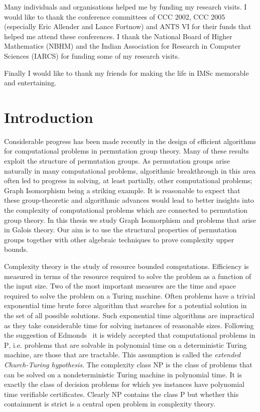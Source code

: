 \documentclass[11pt]{madras}%
\theoremstyle{remark}
\begin{document}
Many individuals and organisations helped me by funding my research
visits.  I would like to thank the conference committees of CCC 2002,
CCC 2005 (especially Eric Allender and Lance Fortnow) and ANTS VI for
their funds that helped me attend these conferences.  I thank the
National Board of Higher Mathematics (NBHM) and the Indian Association
for Research in Computer Sciences (IARCS) for funding some of my
research visits.

Finally I would like to thank my friends for making the life in IMSc
memorable and entertaining.



\tableofcontents
\renewcommand{\nomname}{Notation\addcontentsline{toc}{chapter}{Notation}}
\printglossary

\chapter{Introduction}%

Considerable progress has been made recently in the design of
efficient algorithms for computational problems in permutation group
theory. Many of these results exploit the structure of permutation
groups. As permutation groups arise naturally in many computational
problems, algorithmic breakthrough in this area often led to progress
in solving, at least partially, other computational problems; Graph
Isomorphism being a striking example. It is reasonable to expect that
these group-theoretic and algorithmic advances would lead to better
insights into the complexity of computational problems which are
connected to permutation group theory. In this thesis we study Graph
Isomorphism and problems that arise in Galois theory. Our aim is to
use the structural properties of permutation groups together with
other algebraic techniques to prove complexity upper bounds.

Complexity theory is the study of resource bounded computations.
Efficiency is measured in terms of the resource required to solve the
problem as a function of the input size. Two of the most important
measures are the time and space required to solve the problem on a
Turing machine.  Often problems have a trivial exponential time brute
force algorithm that searches for a potential solution in the set of
all possible solutions. Such exponential time algorithms are
impractical as they take considerable time for solving instances of
reasonable sizes. Following the suggestion of
Edmonds~\cite{edmonds65paths} it is widely accepted that computational
problems in $\mathrm{P}$, i.e. problems that are solvable in
polynomial time on a deterministic Turing machine, are those that are
tractable. This assumption is called the \emph{extended Church-Turing
  hypothesis}. The complexity class $\mathrm{NP}$ is the class of
problems that can be solved on a nondeterministic Turing machine in
polynomial time.  It is exactly the class of decision problems for
which yes instances have polynomial time verifiable certificates.
Clearly $\mathrm{NP}$ contains the class $\mathrm{P}$ but whether this
containment is strict is a central open problem in complexity theory.
\end{document}
